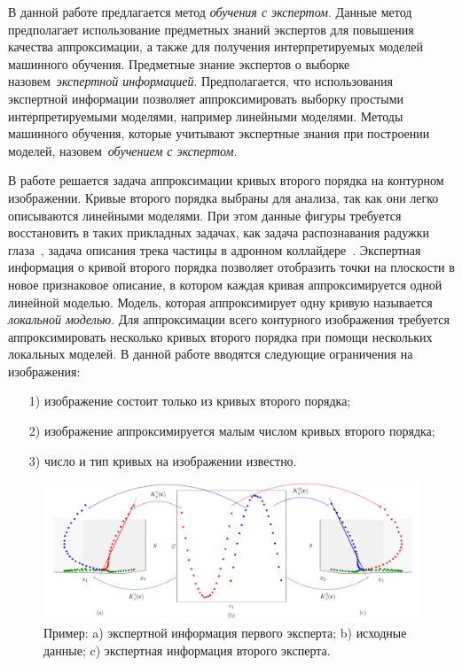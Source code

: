 \documentclass[12pt, twoside]{article}
\numberwithin{equation}{section}
\begin{document}
В данной работе предлагается метод \textit{обучения с экспертом}.
Данные метод предполагает использование предметных знаний экспертов для повышения качества аппроксимации, а также для получения интерпретируемых моделей машинного обучения.
Предметные знание экспертов о выборке назовем~\textit{экспертной информацией}.
Предполагается, что использования экспертной информации позволяет аппроксимировать выборку простыми интерпретируемыми моделями, например линейными моделями. Методы машинного обучения, которые учитывают экспертные знания при построении моделей, назовем~\textit{обучением с экспертом}.

В работе решается задача аппроксимации кривых второго порядка на контурном изображении. Кривые второго порядка выбраны для анализа, так как они легко описываются линейными моделями. При этом данные фигуры требуется восстановить в таких прикладных задачах, как задача распознавания радужки глаза~\cite{Matveev2010, Matveev2014, Bowyer2010}, задача описания трека частицы в адронном коллайдере~\cite{Dalila2018}. Экспертная информация о кривой второго порядка позволяет отобразить точки на плоскости в новое признаковое описание, в котором каждая кривая аппроксимируется одной линейной моделью. Модель, которая аппроксимирует одну кривую называется \textit{локальной моделью}. Для аппроксимации всего контурного изображения требуется аппроксимировать несколько кривых второго порядка при помощи нескольких локальных моделей. В данной работе вводятся следующие ограничения на изображения:
\begin{enumerate}
	\item[1)] изображение состоит только из кривых второго порядка;
	\item[2)] изображение аппроксимируется малым числом кривых второго порядка;
	\item[3)] число и тип кривых на изображении известно.
\end{enumerate}

\begin{figure}[h!]
     \centering
     \includegraphics[width=\textwidth]{figures/explanation}
     \caption{Пример: a) экспертной информация первого эксперта; b) исходные данные; c) экспертная информация второго эксперта.}
    \label{intro:fig2}
\end{figure}
\end{document}
